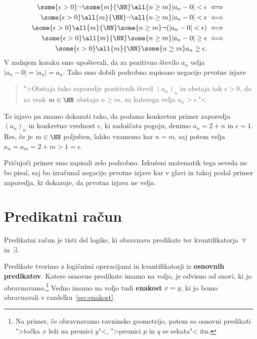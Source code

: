 \begin{zgled}
\begin{align*}
    \some{\epsilon > 0} \lnot \some{m}{\NN} \all{n \geq m}
          |a_n - 0| < \epsilon &\iff
    \\
    \some{\epsilon > 0} \all{m}{\NN} \lnot \all{n \geq m}
          |a_n - 0| < \epsilon &\iff
    \\
    \some{\epsilon > 0} \all{m}{\NN} \some{n \geq m}
          \lnot (|a_n - 0| < \epsilon) &\iff
    \\
    \some{\epsilon > 0} \all{m}{\NN} \some{n \geq m}
          |a_n - 0| \geq \epsilon &\iff
    \\
    \some{\epsilon > 0} \all{m}{\NN} \some{n \geq m}
          a_n \geq \epsilon.
  \end{align*}
  V zadnjem koraku smo upoštevali, da za pozitivno število $a_n$ velja
  $|a_n - 0| = |a_n| = a_n$. Tako smo dobili podrobno zapisano
  negacijo prvotne izjave
  \begin{quote}
    ">Obstaja tako zaporedje pozitivnih števil $(a_n)_n$ in obstaja
    tak $\epsilon > 0$, da za vsak $m \in \NN$ obstaja $n \geq m$, za
    katerega velja $a_n > \epsilon$."<
  \end{quote}
  To izjavo pa znamo dokazati tako, da podamo konkreten primer
  zaporedja $(a_n)_n$ in konkretno vrednost $\epsilon$, ki zadoščata
  pogoju, denimo $a_n = 2 + n$ in $\epsilon = 1$. Res, če je $m \in
  \NN$ poljuben, lahko vzamemo kar $n = m$, saj potem velja $a_n = a_m
  = 2 + m > 1 = \epsilon$.

  Pričujoči primer smo zapisali zelo podrobno. Izkušeni matematik tega
  seveda ne bo pisal, saj bo izračunal negacijo prvotne izjave kar v
  glavi in takoj podal primer zaporedja, ki dokazuje, da prvotna
  izjava ne velja.
\end{zgled}

\section{Predikatni račun}
\label{sec:predikatni-racun}

Predikatni račun je tisti del logike, ki obravnava predikate ter
kvantifikatorja~$\forall$ in~$\exists$.

Predikate tvorimo z logičnimi operacijami in kvantifikatorji iz
\textbf{osnovnih predikatov}. Katere osnovne predikate imamo na voljo,
je odvisno od snovi, ki jo obravnavamo.\footnote{Na primer, če
  obravnavamo ravninsko geometrijo, potem so osnovni predikati ">točka
  $x$ leži na premici $y$"<, ">premici $p$ in $q$ se sekata"< itn.}
Vedno imamo na voljo tudi \textbf{enakost} $x = y$, ki jo bomo
obravnavali v razdelku~\ref{sec:enakost}.

